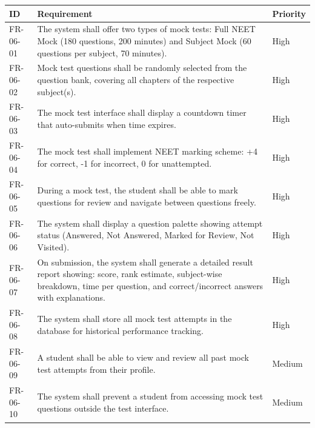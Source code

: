 \documentclass[
]{article}
\begin{document}
\begin{longtable}[]{@{}
  >{\raggedright\arraybackslash}p{}
  >{\raggedright\arraybackslash}p{}
  >{\raggedright\arraybackslash}p{}@{}}
\toprule\noalign{}
\begin{minipage}[b]{\linewidth}\raggedright
ID
\end{minipage} & \begin{minipage}[b]{\linewidth}\raggedright
Requirement
\end{minipage} & \begin{minipage}[b]{\linewidth}\raggedright
Priority
\end{minipage} \\
\midrule\noalign{}
\endhead
\bottomrule\noalign{}
\endlastfoot
FR-06-01 & The system shall offer two types of mock tests: Full NEET
Mock (180 questions, 200 minutes) and Subject Mock (60 questions per
subject, 70 minutes). & High \\
FR-06-02 & Mock test questions shall be randomly selected from the
question bank, covering all chapters of the respective subject(s). &
High \\
FR-06-03 & The mock test interface shall display a countdown timer that
auto-submits when time expires. & High \\
FR-06-04 & The mock test shall implement NEET marking scheme: +4 for
correct, -1 for incorrect, 0 for unattempted. & High \\
FR-06-05 & During a mock test, the student shall be able to mark
questions for review and navigate between questions freely. & High \\
FR-06-06 & The system shall display a question palette showing attempt
status (Answered, Not Answered, Marked for Review, Not Visited). &
High \\
FR-06-07 & On submission, the system shall generate a detailed result
report showing: score, rank estimate, subject-wise breakdown, time per
question, and correct/incorrect answers with explanations. & High \\
FR-06-08 & The system shall store all mock test attempts in the database
for historical performance tracking. & High \\
FR-06-09 & A student shall be able to view and review all past mock test
attempts from their profile. & Medium \\
FR-06-10 & The system shall prevent a student from accessing mock test
questions outside the test interface. & Medium \\
\end{longtable}
\end{document}
